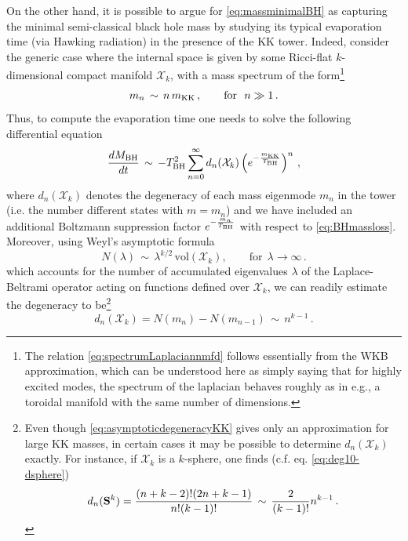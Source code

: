 On the other hand, it is possible to argue for \eqref{eq:massminimalBH} as capturing the minimal semi-classical black hole mass by studying its typical evaporation time (via Hawking radiation) in the presence of the KK tower. Indeed, consider the generic case where the internal space is given by some Ricci-flat $k$-dimensional compact manifold $\mathcal{X}_k$, with a mass spectrum of the form\footnote{The relation \eqref{eq:spectrumLaplaciannmfd} follows essentially from the WKB approximation, which can be understood here as simply saying that for highly excited modes, the spectrum of the laplacian behaves roughly as in e.g., a toroidal manifold with the same number of dimensions.}
%
\begin{align}\label{eq:spectrumLaplaciannmfd}
	m_n\, \sim\, n\, m_{\text{KK}}\, , \qquad \text{for}\ \ n \gg 1\, .
\end{align}
%
Thus, to compute the evaporation time one needs to solve the following differential equation
%
\begin{equation}\label{eq: deg t}
    \frac{d M_{\rm BH}}{d t}\, \sim\, - T_{\rm BH}^2\sum_{n=0}^{\infty}d_{n}(\mathcal{X}_k)\left(e^{-\frac{m_{\text{KK}}}{T_{\rm BH}}}\right)^{n}\,,
\end{equation}
%
where $d_n(\mathcal{X}_k)$ denotes the degeneracy of each mass eigenmode $m_n$ in the tower (i.e. the number different states with $m=m_n$) and we have included an additional Boltzmann suppression factor $e^{-\frac{m_n}{T_{\rm BH}}}$ with respect to \eqref{eq:BHmassloss}. Moreover, using Weyl's asymptotic formula
%
\begin{equation}
    N(\lambda)\, \sim\, \lambda^{k/2}\, \text{vol} \left( \mathcal{X}_k\right),\qquad \text{for}\ \ \lambda\to\infty\, .
\end{equation}
%
which accounts for the number of accumulated eigenvalues $\lambda$ of the Laplace-Beltrami operator acting on functions defined over $\mathcal{X}_k$, we can readily estimate the degeneracy to be\footnote{Even though \eqref{eq:asymptoticdegeneracyKK} gives only an approximation for large KK masses, in certain cases it may be possible to determine $d_n(\mathcal{X}_k)$ exactly. For instance, if $\mathcal{X}_k$ is a $k$-sphere, one finds (c.f. eq. \eqref{eq:deg10-dsphere})
%
\begin{equation}\label{eq:asymptoticdegeneracyKK}
    \notag d_n(\mathbf{S}^k)=\frac{(n+k-2)!(2n+k-1)}{n!(k-1)!}\, \sim\, \frac{2}{(k-1)!}n^{k-1}\, .
\end{equation}
}
%
\begin{equation}
    d_n(\mathcal{X}_k) = N(m_n)-N(m_{n-1})\, \sim\, n^{k-1}\, .
\end{equation}
